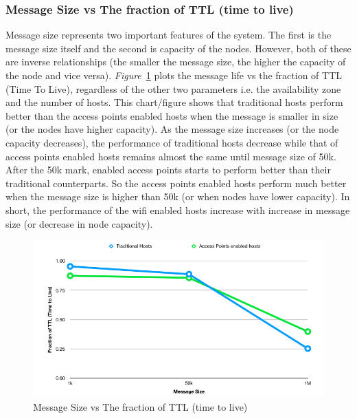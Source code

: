 \subsubsection{Message Size vs The fraction of TTL (time to live)}
Message size represents two important features of the system. The first is the message size itself and the second is capacity of the nodes. However, both of these are inverse relationships (the smaller the message size, the higher the capacity of the node and vice versa). \emph{Figure}~\ref{fig:scenario1_message_size} plots the message life vs the fraction of TTL (Time To Live), regardless of the other two parameters i.e. the availability zone and the number of hosts. This chart/figure shows that traditional hosts perform better than the access points enabled hosts when the message is smaller in size (or the nodes have higher capacity). As the message size increases (or the node capacity decreases), the performance of traditional hosts decrease while that of access points enabled hosts remains almost the same until message size of 50k. After the 50k mark, enabled access points starts to perform better than their traditional counterparts. So the access points enabled hosts perform much better when the message size is higher than 50k (or when nodes have lower capacity). In short, the performance of the wifi enabled hosts increase with increase in message size (or decrease in node capacity).

\begin{figure}[h]
  \centering
  \includegraphics[scale=0.43]{./figures/scenario1_message_size}
  \caption{Message Size vs The fraction of TTL (time to live)}
  \label{fig:scenario1_message_size}
\end{figure}

